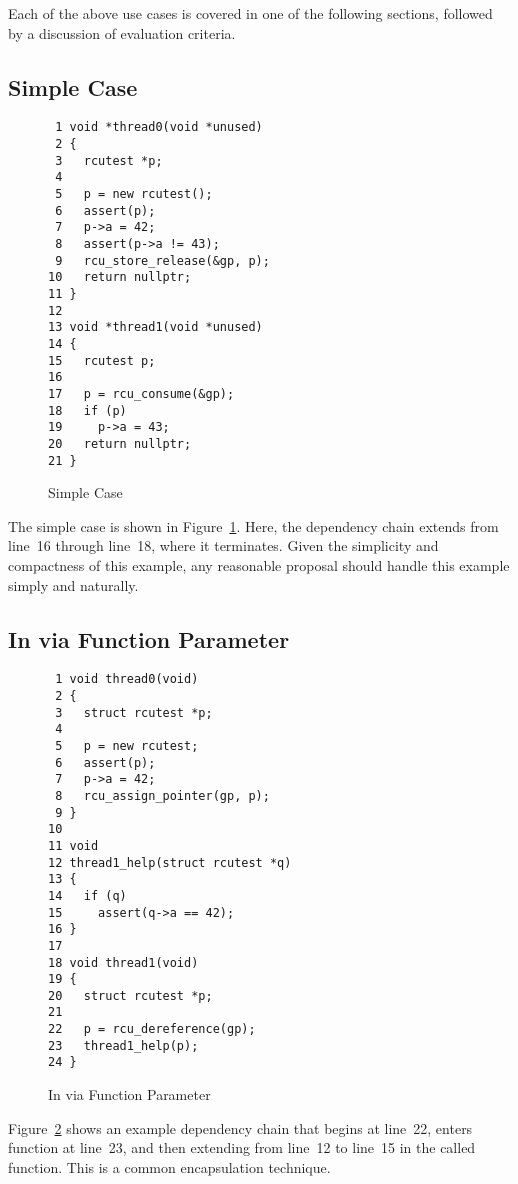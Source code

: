 \documentclass[letterpaper,10pt]{article}
\begin{document}
Each of the above use cases is covered in one of the following sections,
followed by a discussion of evaluation criteria.

\subsection{Simple Case}
\label{sec:Simple Case}

\begin{figure}[tbp]
{ \scriptsize
\begin{verbatim}
 1 void *thread0(void *unused)
 2 {
 3   rcutest *p;
 4
 5   p = new rcutest();
 6   assert(p);
 7   p->a = 42;
 8   assert(p->a != 43);
 9   rcu_store_release(&gp, p);
10   return nullptr;
11 }
12
13 void *thread1(void *unused)
14 {
15   rcutest p;
16
17   p = rcu_consume(&gp);
18   if (p)
19     p->a = 43;
20   return nullptr;
21 }
\end{verbatim}
}
\caption{Simple Case}
\label{fig:Simple Case}
\end{figure}

The simple case is shown in
Figure~\ref{fig:Simple Case}.
Here, the dependency chain extends from line~16 through line~18,
where it terminates.
Given the simplicity and compactness of this example, any reasonable
proposal should handle this example simply and naturally.

\subsection{In via Function Parameter}
\label{sec:In via Function Parameter}

\begin{figure}[tbp]
{ \scriptsize
\begin{verbatim}
 1 void thread0(void)
 2 {
 3   struct rcutest *p;
 4
 5   p = new rcutest;
 6   assert(p);
 7   p->a = 42;
 8   rcu_assign_pointer(gp, p);
 9 }
10
11 void
12 thread1_help(struct rcutest *q)
13 {
14   if (q)
15     assert(q->a == 42);
16 }
17
18 void thread1(void)
19 {
20   struct rcutest *p;
21
22   p = rcu_dereference(gp);
23   thread1_help(p);
24 }
\end{verbatim}
}
\caption{In via Function Parameter}
\label{fig:In via Function Parameter}
\end{figure}

Figure~\ref{fig:In via Function Parameter}
shows an example dependency chain that begins at line~22,
enters function  at line~23,
and then extending from line~12 to line~15 in the called function.
This is a common encapsulation technique.
\end{document}
